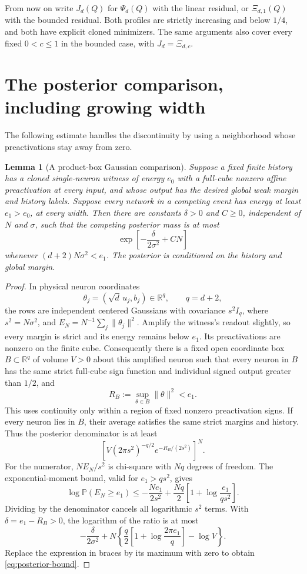 \documentclass[11pt]{article}
\newtheorem{lemma}[theorem]{Lemma}
\newcommand{\R}{\mathbb R}
\newcommand{\Pp}{\mathbb P}
\begin{document}
From now on write $J_d(Q)$ for $\Psi_d(Q)$ with the linear residual,
or $\Xi_{d,1}(Q)$ with the bounded residual. Both profiles are strictly
increasing and below $1/4$, and both have explicit cloned minimizers.
The same arguments also cover every fixed $0<c\le1$ in the bounded
case, with $J_d=\Xi_{d,c}$.



\section{The posterior comparison, including growing width}

The following estimate handles the discontinuity by using a neighborhood
whose preactivations stay away from zero.

\begin{lemma}[A product-box Gaussian comparison]\label{lem:box}
Suppose a fixed finite history has a cloned single-neuron witness of
energy $e_0$ with a full-cube nonzero affine preactivation at every input,
and whose output has the desired global weak margin and history labels.
Suppose every network in a competing event has energy at least $e_1>e_0$,
at every width. Then there are constants $\delta>0$ and $C\ge0$,
independent of $N$ and $\sigma$, such that the competing posterior mass
is at most
\begin{equation}\label{eq:posterior-bound}
 \exp\left[-\frac{\delta}{2\sigma^2}+CN\right]
\end{equation}
whenever $(d+2)N\sigma^2<e_1$.
The posterior is conditioned on the history and global margin.
\end{lemma}
\begin{proof}
In physical neuron coordinates
\[
 \theta_j=(\sqrt d\,u_j,b_j)\in\R^q,\qquad q=d+2,
\]
the rows are independent centered Gaussians with covariance
$s^2I_q$, where $s^2=N\sigma^2$, and
$E_N=N^{-1}\sum_j\|\theta_j\|^2$.
Amplify the witness's readout slightly, so every margin is strict and its
energy remains below $e_1$. Its preactivations are nonzero on the finite
cube. Consequently there is a fixed open coordinate box
$B\subset\R^q$ of volume $V>0$ about this amplified neuron such that
every neuron in $B$ has the same strict full-cube sign function and
individual signed output greater than $1/2$, and
\[
 R_B:=\sup_{\theta\in B}\|\theta\|^2<e_1.
\]
This uses continuity only within a region of fixed nonzero preactivation
signs. If every neuron lies in $B$, their average satisfies the same
strict margins and history. Thus the posterior denominator is at least
\[
 \left[V(2\pi s^2)^{-q/2}e^{-R_B/(2s^2)}\right]^N.
\]
For the numerator, $NE_N/s^2$ is chi-square with $Nq$ degrees of freedom.
The exponential-moment bound, valid for $e_1>qs^2$, gives
\[
 \log\Pp(E_N\ge e_1)
 \le-\frac{Ne_1}{2s^2}
       +\frac{Nq}{2}\left[1+\log\frac{e_1}{qs^2}\right].
\]
Dividing by the denominator cancels all logarithmic $s^2$ terms. With
$\delta=e_1-R_B>0$, the logarithm of the ratio is at most
\[
 -\frac{\delta}{2\sigma^2}
 +N\left\{\frac q2\left[1+\log\frac{2\pi e_1}{q}\right]-\log V\right\}.
\]
Replace the expression in braces by its maximum with zero to obtain
\eqref{eq:posterior-bound}.
\end{proof}
\end{document}
